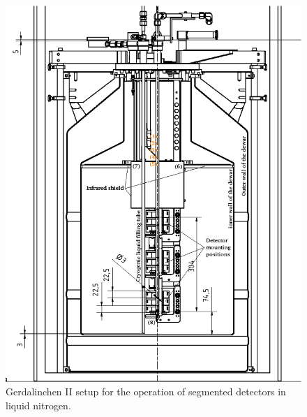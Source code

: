 \begin{figure}[hbtp]
\centering
\includegraphics[width=\textwidth]{GIIscheme}
\caption{Gerdalinchen II setup for the operation of segmented detectors in liquid nitrogen.}
\label{fig:ii:sch}
\end{figure}

